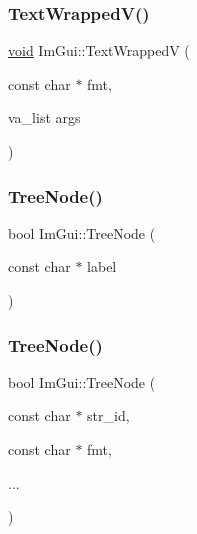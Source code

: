 \mbox{\label{namespaceImGui_a9019a388cd0c410bcb3d3ae63a008123}} 
\subsubsection{\texorpdfstring{Text\+Wrapped\+V()}{TextWrappedV()}}
{\footnotesize\ttfamily \hyperlink{imgui__impl__opengl3__loader_8h_ac668e7cffd9e2e9cfee428b9b2f34fa7}{void} Im\+Gui\+::\+Text\+WrappedV (\begin{DoxyParamCaption}\item[{const char $\ast$}]{fmt,  }\item[{va\+\_\+list}]{args }\end{DoxyParamCaption})}

\mbox{\label{namespaceImGui_a4dff507ce8bbe0da9556bb50b1e60d7f}} 
\subsubsection{\texorpdfstring{Tree\+Node()}{TreeNode()}\hspace{0.1cm}{\footnotesize\ttfamily [1/3]}}
{\footnotesize\ttfamily bool Im\+Gui\+::\+Tree\+Node (\begin{DoxyParamCaption}\item[{const char $\ast$}]{label }\end{DoxyParamCaption})}

\mbox{\label{namespaceImGui_a6e6e4de20291002430854cbd8cd58843}} 
\subsubsection{\texorpdfstring{Tree\+Node()}{TreeNode()}\hspace{0.1cm}{\footnotesize\ttfamily [2/3]}}
{\footnotesize\ttfamily bool Im\+Gui\+::\+Tree\+Node (\begin{DoxyParamCaption}\item[{const char $\ast$}]{str\+\_\+id,  }\item[{const char $\ast$}]{fmt,  }\item[{}]{... }\end{DoxyParamCaption})}


